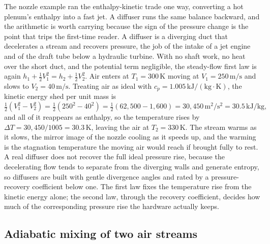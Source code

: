 The nozzle example ran the enthalpy-kinetic trade one way, converting a hot
plenum's enthalpy into a fast jet. A diffuser runs the same balance backward, and
the arithmetic is worth carrying because the sign of the pressure change is the
point that trips the first-time reader. A diffuser is a diverging duct that
decelerates a stream and recovers pressure, the job of the intake of a jet engine
and of the draft tube below a hydraulic turbine. With no shaft work, no heat over
the short duct, and the potential term negligible, the steady-flow first law is
again $h_1 + \tfrac12 V_1^2 = h_2 + \tfrac12 V_2^2$. Air enters at
$T_1 = 300\,\si{\kelvin}$ moving at $V_1 = 250\,\text{m}/\text{s}$ and slows to
$V_2 = 40\,\text{m}/\text{s}$. Treating air as ideal with $c_p = 1.005\,\text{kJ}/
(\text{kg}\cdot\si{\kelvin})$, the kinetic energy shed per unit mass is
\[
\tfrac12(V_1^2 - V_2^2) = \tfrac12(250^2 - 40^2) = \tfrac12(62{,}500 - 1{,}600)
= 30{,}450\,\text{m}^2/\text{s}^2 = 30.5\,\text{kJ}/\text{kg},
\]
and all of it reappears as enthalpy, so the temperature rises by
$\Delta T = 30{,}450/1005 = 30.3\,\si{\kelvin}$, leaving the air at
$T_2 = 330\,\si{\kelvin}$. The stream warms as it slows, the mirror image of the
nozzle cooling as it speeds up, and the warming is the stagnation temperature the
moving air would reach if brought fully to rest. A real diffuser does not recover
the full ideal pressure rise, because the decelerating flow tends to separate from
the diverging walls and generate entropy, so diffusers are built with gentle
divergence angles and rated by a pressure-recovery coefficient below one. The
first law fixes the temperature rise from the kinetic energy alone; the second law,
through the recovery coefficient, decides how much of the corresponding pressure
rise the hardware actually keeps.

\subsection{Adiabatic mixing of two air streams}


